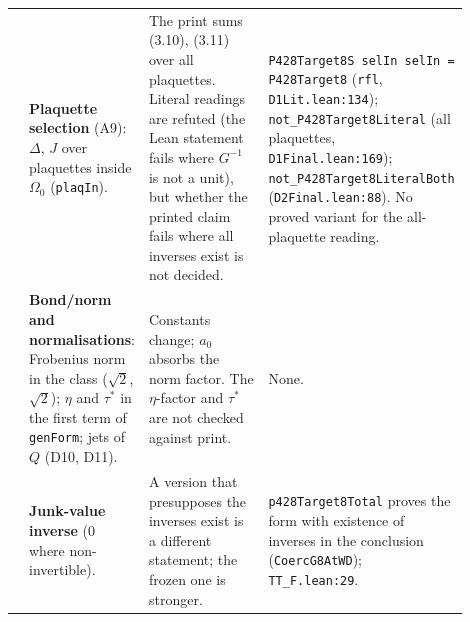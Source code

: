 \documentclass[10pt,a4paper]{article}
\begin{document}
\begin{longtable}{@{}>{\raggedright\arraybackslash}p{0.03\linewidth}>{\raggedright\arraybackslash}p{0.19\linewidth}>{\raggedright\arraybackslash}p{0.33\linewidth}>{\raggedright\arraybackslash}p{0.35\linewidth}@{}}
7 & \textbf{Plaquette selection} (A9): $\Delta$, $J$ over plaquettes inside $\Omega_0$ (\texttt{plaqIn}). & The print sums (3.10), (3.11) over all plaquettes. Literal readings are refuted (the Lean statement fails where $G^{-1}$ is not a unit), but whether the printed claim fails where all inverses exist is not decided. & \texttt{P428Target8S selIn selIn = P428Target8} (\texttt{rfl}, \texttt{D1Lit.lean:134}); \texttt{not\_P428Target8Literal} (all plaquettes, \texttt{D1Final.lean:169}); \texttt{not\_P428Target8LiteralBoth} (\texttt{D2Final.lean:88}). No proved variant for the all-plaquette reading. \\
8 & \textbf{Bond/norm and normalisations}: Frobenius norm in the class ($\sqrt2$, $\surd2$); $\eta$ and $\tau^*$ in the first term of \texttt{genForm}; jets of $Q$ (D10, D11). & Constants change; $a_0$ absorbs the norm factor. The $\eta$-factor and $\tau^*$ are not checked against print. & None. \\
9 & \textbf{Junk-value inverse} ($0$ where non-invertible). & A version that presupposes the inverses exist is a different statement; the frozen one is stronger. & \texttt{p428Target8Total} proves the form with existence of inverses in the conclusion (\texttt{CoercG8AtWD}); \texttt{TT\_F.lean:29}. \\
\bottomrule
\end{longtable}
\end{document}
